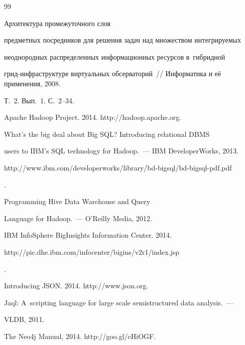 {{\begin{thebibliography}{99}

 Архитектура промежуточного слоя

предметных посредников для решения задач над множеством интегрируемых

неоднородных распределенных информационных ресурсов в~гибридной

грид-инфраструктуре виртуальных обсерваторий~/\!\!/ Информатика и её применения, 2008.

Т.~2. Вып.~1. С.~2--34.


 Apache Hadoop Project. 2014. {\sf http://hadoop.apache.org}.


 What's the big deal about Big SQL? Introducing relational DBMS

users to IBM's SQL technology for Hadoop.~--- IBM DeveloperWorks, 2013. {\sf

http://www.ibm.com/developerworks/library/bd-bigsql/bd-bigsql-pdf.pdf}.


 Programming Hive Data Warehouse and Query

Language for Hadoop.~--- O'Reilly Media, 2012.


IBM InfoSphere BigInsights Information Center. 2014. {\sf

http://pic.dhe.ibm.com/\linebreak infocenter/bigins/v2r1/index.jsp}.


Introducing JSON. 2014. {\sf http://www.json.org}.


 Jaql: A~scripting language for large scale semistructured data analysis.~---

VLDB, 2011.


The Neo4j Manual, 2014. {\sf http://goo.gl/cHiOGF}.



\end{thebibliography}}}
